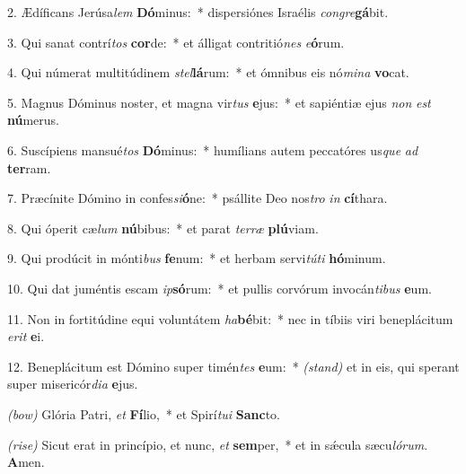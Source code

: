 2. Ædíficans Jerúsa\textit{lem} \textbf{Dó}minus:~* dispersiónes Israélis \textit{con}\textit{gre}\textbf{gá}bit.

3. Qui sanat contrí\textit{tos} \textbf{cor}de:~* et álligat contritió\textit{nes} \textit{e}\textbf{ó}rum.

4. Qui númerat multitúdinem \textit{stel}\textbf{lá}rum:~* et ómnibus eis nó\textit{mi}\textit{na} \textbf{vo}cat.

5. Magnus Dóminus noster, et magna vir\textit{tus} \textbf{e}jus:~* et sapiéntiæ ejus \textit{non} \textit{est} \textbf{nú}merus.

6. Suscípiens mansué\textit{tos} \textbf{Dó}minus:~* humílians autem peccatóres us\textit{que} \textit{ad} \textbf{ter}ram.

7. Præcínite Dómino in confes\textit{si}\textbf{ó}ne:~* psállite Deo nos\textit{tro} \textit{in} \textbf{cí}thara.

8. Qui óperit cæ\textit{lum} \textbf{nú}bibus:~* et parat \textit{ter}\textit{ræ} \textbf{plú}viam.

9. Qui prodúcit in mónti\textit{bus} \textbf{fe}num:~* et herbam servi\textit{tú}\textit{ti} \textbf{hó}minum.

10. Qui dat juméntis escam \textit{ip}\textbf{só}rum:~* et pullis corvórum invocán\textit{ti}\textit{bus} \textbf{e}um.

11. Non in fortitúdine equi voluntátem \textit{ha}\textbf{bé}bit:~* nec in tíbiis viri beneplácitum \textit{e}\textit{rit} \textbf{e}i.

12. Beneplácitum est Dómino super timén\textit{tes} \textbf{e}um:~* {\color{red}\textit{(stand)}} et in eis, qui sperant super misericór\textit{di}\textit{a} \textbf{e}jus.

{\color{red}\textit{(bow)}} Glória Patri, \textit{et} \textbf{Fí}lio,~* et Spirí\textit{tu}\textit{i} \textbf{Sanc}to.

{\color{red}\textit{(rise)}} Sicut erat in princípio, et nunc, \textit{et} \textbf{sem}per,~* et in s\'{\ae}cula sæcu\textit{ló}\textit{rum}. \textbf{A}men.